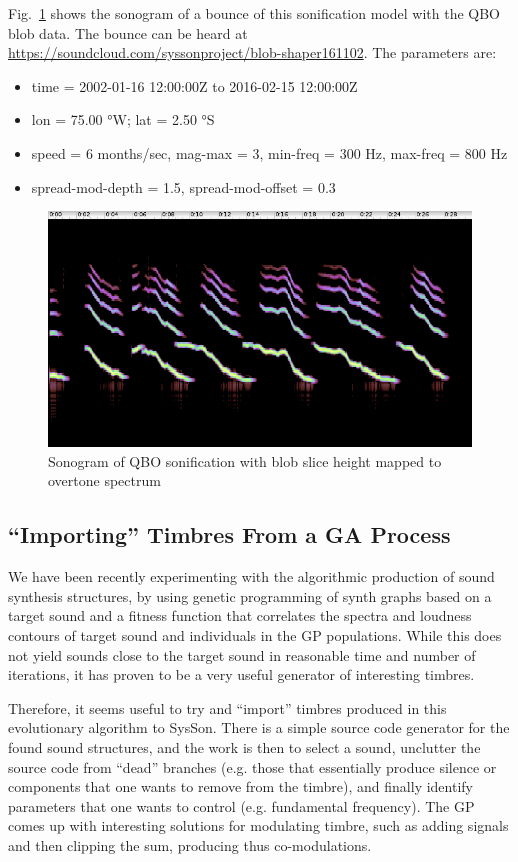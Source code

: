 \documentclass[11pt,a4paper]{article}
\newcommand{\figref}[1]{Fig.~\ref{#1}}
\begin{document}
\figref{fig:blob-shaper-161102-sono} shows the sonogram of a bounce of this sonification model with the QBO blob data. The bounce can be heard at \url{https://soundcloud.com/syssonproject/blob-shaper161102}. The parameters are:
%
\begin{itemize}
\item time = 2002-01-16 12:00:00Z to 2016-02-15 12:00:00Z
\item lon = 75.00 °W; lat = 2.50 °S
\item speed = 6 months/sec, mag-max = 3, min-freq = 300 Hz, max-freq  = 800 Hz
\item spread-mod-depth = 1.5, spread-mod-offset = 0.3
\end{itemize}

\begin{figure}
\includegraphics[width=\textwidth]{figures/blob-shaper161102.png}
\caption{Sonogram of QBO sonification with blob slice height mapped to overtone spectrum}
\label{fig:blob-shaper-161102-sono}
\end{figure}
%

\subsection{``Importing'' Timbres From a GA Process}

We have been recently experimenting with the algorithmic production of sound synthesis structures, by using genetic programming of synth graphs based on a target sound and a fitness function that correlates the spectra and loudness contours of target sound and individuals in the GP populations. While this does not yield sounds close to the target sound in reasonable time and number of iterations, it has proven to be a very useful generator of interesting timbres.

Therefore, it seems useful to try and ``import'' timbres produced in this evolutionary algorithm to SysSon. There is a simple source code generator for the found sound structures, and the work is then to select a sound, unclutter the source code from ``dead'' branches (e.g. those that essentially produce silence or components that one wants to remove from the timbre), and finally identify parameters that one wants to control (e.g. fundamental frequency). The GP comes up with interesting solutions for modulating timbre, such as adding signals and then clipping the sum, producing thus co-modulations.
\end{document}
